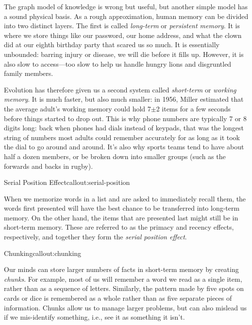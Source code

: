 The graph model of knowledge is wrong but useful, but another simple
model has a sound physical basis.  As a rough approximation, human
memory can be divided into two distinct layers. The first is
called \emph{long-term} or \emph{persistent memory}. It is where we
store things like our password, our home address, and what the clown
did at our eighth birthday party that scared us so much. It is
essentially unbounded: barring injury or disease, we will die before
it fills up.  However, it is also slow to access---too slow to help us
handle hungry lions and disgruntled family members.

Evolution has therefore given us a second system
called \emph{short-term} or \emph{working memory}. It is much faster,
but also much smaller: in 1956, Miller estimated that the average
adult's working memory could hold 7$\pm$2 items for a few seconds
before things started to drop out. This is why phone numbers are
typically 7 or 8 digits long: back when phones had dials instead of
keypads, that was the longest string of numbers most adults could
remember accurately for as long as it took the dial to go around and
around. It's also why sports teams tend to have about half a dozen
members, or be broken down into smaller groups (such as the forwards
and backs in rugby).

\begin{callout}{Serial Position Effect}{callout:serial-position}

When we memorize words in a list and are asked to immediately recall
them, the words first presented will have the best chance to be
transferred into long-term memory. On the other hand, the items that
are presented last might still be in short-term memory. These are
referred to as the primacy and recency effects, respectively, and
together they form the \emph{serial position effect}.

\end{callout}

\begin{callout}{Chunking}{callout:chunking}

Our minds can store larger numbers of facts in short-term memory by
creating \emph{chunks}. For example, most of us will remember a word
we read as a single item, rather than as a sequence of letters.
Similarly, the pattern made by five spots on cards or dice is
remembered as a whole rather than as five separate pieces of
information.  Chunks allow us to manage larger problems, but can also
mislead us if we mis-identify something, i.e., see it as something it
isn't.

\end{callout}

